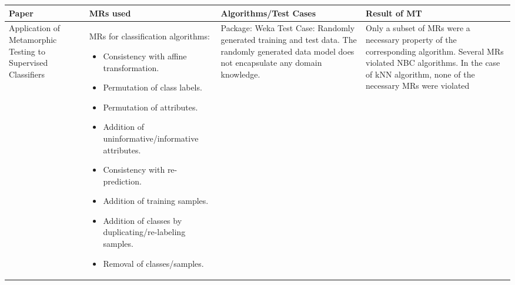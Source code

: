 
\begin{tabularx}{\textwidth}{|X|X|X|X|}
 \hline
  Paper    & MRs used & Algorithms/Test Cases & Result of MT  \\ \hline
  Application of Metamorphic Testing to Supervised Classifiers &
  MRs for classification algorithms:
  \begin{itemize}[leftmargin=10pt, labelindent=0pt, itemindent=0pt]
    \item Consistency with affine transformation.
    \item Permutation of class labels.
    \item Permutation of attributes.
    \item Addition of uninformative/informative attributes.
    \item Consistency with re-prediction.
    \item Addition of training samples.
    \item Addition of classes by duplicating/re-labeling samples.
    \item Removal of classes/samples.
  \end{itemize}
  & Package: Weka
  Test Case: Randomly generated training and test data. The randomly generated data model does not encapsulate any domain knowledge.
  & Only a subset of MRs were a necessary property of the corresponding algorithm.  Several MRs violated NBC algorithms.  In the case of kNN algorithm, none of the necessary MRs were violated \\
  \hline
\end{tabularx}
